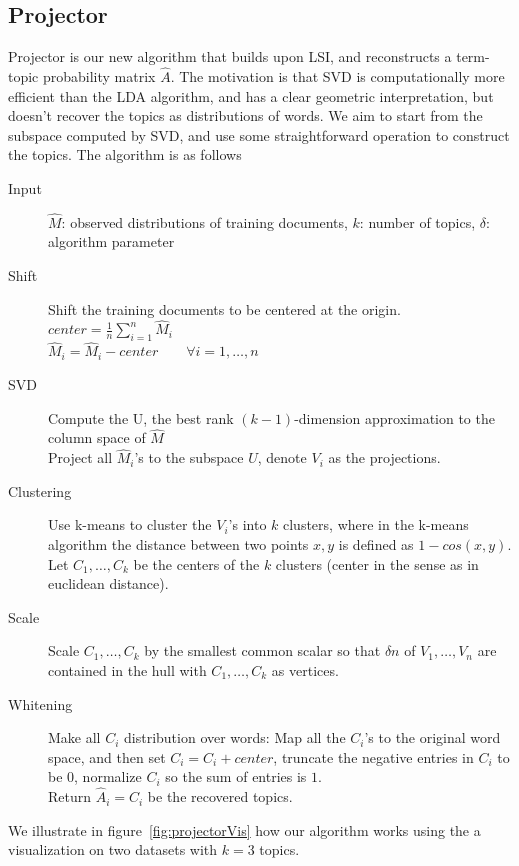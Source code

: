 \subsection{Projector}

Projector is our new algorithm that builds upon LSI, and reconstructs
a term-topic probability matrix $\hat{A}$. The motivation is that SVD
is computationally more efficient than the LDA algorithm, and has a
clear geometric interpretation, but doesn't recover the topics as
distributions of words. We aim to start from the subspace computed by
SVD, and use some straightforward operation to construct the
topics. The algorithm is as
follows
\begin{description}
	\item[Input] $\hat{M}$: observed distributions of training documents, $k$: number of topics, $\delta$: algorithm parameter
	\item[Shift] Shift the training documents to be centered at the origin.\\
			     $center=\frac{1}{n}\sum_{i=1}^n\hat{M}_i$\\
			     $\hat{M}_i=\hat{M}_i-center\qquad \forall i=1,\ldots,n$
	\item[SVD] Compute the U, the best rank $(k-1)$-dimension approximation to the column space of $\hat{M}$\\
                                 Project all $\hat{M}_i$'s to the subspace $U$, denote $V_i$ as the projections.
	\item[Clustering] Use k-means to cluster the $V_i$'s into $k$ clusters, where in the k-means algorithm the distance between two points $x,y$ is defined as $1-cos(x,y)$.\\
				      Let $C_1,\ldots,C_k$ be the centers of the $k$ clusters (center in the sense as in euclidean distance).
	\item[Scale] Scale $C_1,\ldots,C_k$ by the smallest common scalar so that $\delta n$ of $V_1,\ldots,V_n$ are contained in the hull with $C_1,\ldots,C_k$ as vertices. 
	\item[Whitening] Make all $C_i$ distribution over words: Map all the $C_i$'s to the original word space, and then set $C_i=C_i+center$, truncate the negative entries in $C_i$ to be $0$, normalize $C_i$ so the sum of entries is $1$.\\
                                            Return $\hat{A}_i=C_i$ be the recovered topics.
\end{description}
We illustrate in figure~\ref{fig:projectorVis} how our algorithm works
using the a visualization on two datasets with $k=3$
topics.


